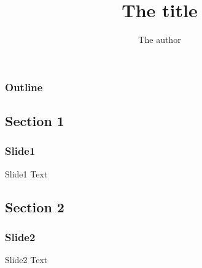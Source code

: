 \documentclass{beamer}
\title{The title}
\author{The author}
\begin{document}
\begin{frame}
\maketitle
\end{frame}

\begin{frame}
   \frametitle{Outline}
      \tableofcontents
\end{frame}

\begin{frame}
\section{Section 1}
\frametitle{Slide1}

Slide1 Text
\end{frame}

\begin{frame}
\section{Section 2}
\frametitle{Slide2}
Slide2 Text
\end{frame}
\end{document}
